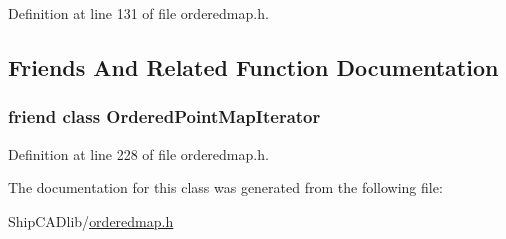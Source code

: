 Definition at line 131 of file orderedmap.\+h.



\subsection{Friends And Related Function Documentation}
\subsubsection[{\texorpdfstring{Ordered\+Point\+Map\+Iterator}{OrderedPointMapIterator}}]{\setlength{\rightskip}{0pt plus 5cm}friend class {\bf Ordered\+Point\+Map\+Iterator}\hspace{0.3cm}{\ttfamily [friend]}}\hypertarget{classOrderedPointMap_a7bb53502d3b4a6a62a846b20b2192e6b}{}\label{classOrderedPointMap_a7bb53502d3b4a6a62a846b20b2192e6b}


Definition at line 228 of file orderedmap.\+h.



The documentation for this class was generated from the following file\+:\begin{DoxyCompactItemize}
\item 
Ship\+C\+A\+Dlib/\hyperlink{orderedmap_8h}{orderedmap.\+h}\end{DoxyCompactItemize}
